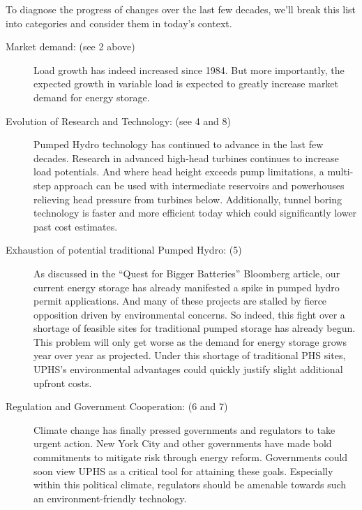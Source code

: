 \documentclass[hidelinks,12pt,a4paper]{article}
\begin{document}
To diagnose the progress of changes over the last few decades, we'll break this list into categories and consider them in today's context.

{\footnotesize
\begin{description}
    \item[Market demand: (see 2 above)] Load growth has indeed increased since 1984. \cite{CenterForSustainableSystemsUniversityOfMichigan} But more importantly, the expected growth in variable load is expected to greatly increase market demand for energy storage.

    \item[Evolution of Research and Technology: (see 4 and 8)] Pumped Hydro technology has continued to advance in the last few decades. Research in advanced high-head turbines continues to increase load potentials. \cite{ParametricDesignOfAnUltrahighHeadPumpTurbine, 700m400MWClassUltrahighheadPumpTurbine} And where head height exceeds pump limitations, a multi-step approach can be used with intermediate reservoirs and powerhouses relieving head pressure from turbines below. \cite{SubSurfacePumpedHydroelectricStorage} Additionally, tunnel boring technology is faster and more efficient today which could significantly lower past cost estimates. \cite{VerticalConveyorsTheRobbinsCompany, TheBoringCompanyShowsOffItsFunctionalDemo}


    \item[Exhaustion of potential traditional Pumped Hydro: (5)] As discussed in the “Quest for Bigger Batteries” Bloomberg article, our current energy storage has already manifested a spike in pumped hydro permit applications. And many of these projects are stalled by fierce opposition driven by environmental concerns. So indeed, this fight over a shortage of feasible sites for traditional pumped storage has already begun. This problem will only get worse as the demand for energy storage grows year over year as projected. Under this shortage of traditional PHS sites, UPHS's environmental advantages could quickly justify slight additional upfront costs.

    \item[Regulation and Government Cooperation: (6 and 7)] Climate change has finally pressed governments and regulators to take urgent action. New York City and other governments have made bold commitments to mitigate risk through energy reform. Governments could soon view UPHS as a critical tool for attaining these goals. Especially within this political climate, regulators should be amenable towards such an environment-friendly technology.


\end{description}}
\end{document}
